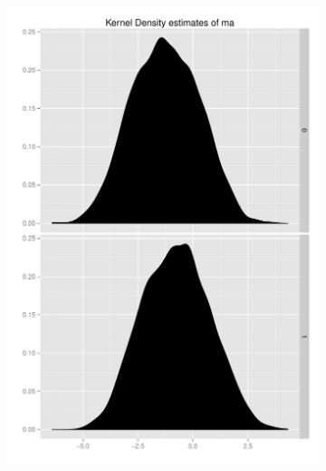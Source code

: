 \documentclass[11pt,letterpaper]{article}
\begin{document}
\begin{landscape}
\begin{figure}[h]
    \begin{subfigure}[b]{0.3\textwidth}\centering \includegraphics[width=1\textwidth]{ma} \end{subfigure}


\end{figure}
\end{landscape}
\end{document}
